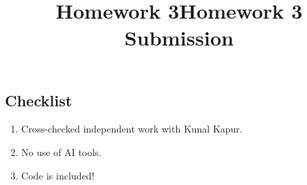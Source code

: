 \documentclass[]{exam}
\title{Homework 3}
\title{Homework 3 Submission}
\begin{document}
\maketitle

\hypertarget{problem-0-homework-checklist}{%
\subsection{Checklist}\label{problem-0-homework-checklist}}

\begin{enumerate}
	\item Cross-checked independent work with Kunal Kapur.
	\item No use of AI tools.
	\item Code is included!
\end{enumerate}
\end{document}
